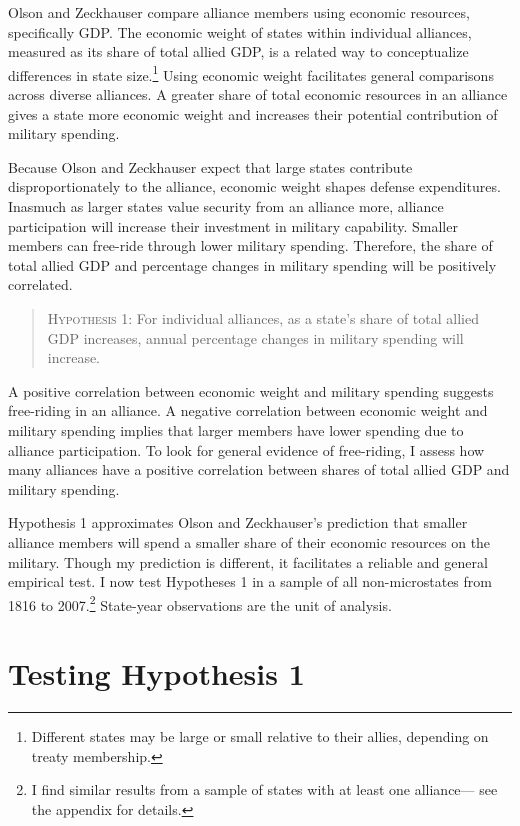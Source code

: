 \documentclass[12pt]{article}
\begin{document}
Olson and Zeckhauser compare alliance members using economic resources, specifically GDP.
The economic weight of states within individual alliances, measured as its share of total allied GDP, is a related way to conceptualize differences in state size.\footnote{Different states may be large or small relative to their allies, depending on treaty membership.} 
Using economic weight facilitates general comparisons across diverse alliances. 
A greater share of total economic resources in an alliance gives a state more economic weight and increases their potential contribution of military spending. 


Because Olson and Zeckhauser expect that large states contribute disproportionately to the alliance, economic weight shapes defense expenditures. 
Inasmuch as larger states value security from an alliance more, alliance participation will increase their investment in military capability.
Smaller members can free-ride through lower military spending. 
Therefore, the share of total allied GDP and percentage changes in military spending will be positively correlated. 


\begin{quote}
\textsc{Hypothesis 1}: For individual alliances, as a state's share of total allied GDP increases, annual percentage changes in military spending will increase. 
\end{quote}


A positive correlation between economic weight and military spending suggests free-riding in an alliance. 
A negative correlation between economic weight and military spending implies that larger members have lower spending due to alliance participation. 
To look for general evidence of free-riding, I assess how many alliances have a positive correlation between shares of total allied GDP and military spending.  
 

Hypothesis 1 approximates Olson and Zeckhauser's prediction that smaller alliance members will spend a smaller share of their economic resources on the military. 
Though my prediction is different, it facilitates a reliable and general empirical test.
I now test Hypotheses 1 in a sample of all non-microstates from 1816 to 2007.\footnote{I find similar results from a sample of states with at least one alliance--- see the appendix for details.} 
State-year observations are the unit of analysis.


\section{Testing Hypothesis 1}
\end{document}
